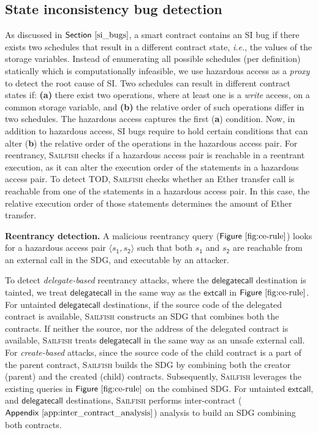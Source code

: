 \documentclass[conference, romanappendices]{tex/IEEEtran}
\theoremstyle{bfnote}
\newcommand{\toolname}{\textsc{Sailfish}\xspace}
\newcommand{\smart}{smart contract}
\newcommand{\ether}{{Ether}\xspace}
\newcommand{\reentrancy}{{reentrancy}\xspace}
\newcommand{\haz}{{hazardous access}\xspace}
\newcommand{\ie}{\textit{i.e.}}
\newcommand{\Fig}[1]{\ensuremath{\sf Figure~\ref{#1}}}
\newcommand{\Sect}[1]{\ensuremath{\sf Section~\ref{#1}}}
\newcommand{\Appen}[1]{\ensuremath{\sf Appendix~\ref{#1}}}
\begin{document}
\subsection{\textbf{State inconsistency bug detection}}
\label{sec:si_bug_detection}
As discussed in \Sect{si_bugs}, a \smart{} contains an SI bug if there exists two schedules that result in a different contract state, \ie, the values of the storage variables.
Instead of enumerating all possible schedules (per definition) statically which is computationally infeasible, we use \haz as a \textit{proxy} to detect the root cause of SI.
Two schedules can result in different contract states if:
\textbf{(a)} there exist two operations, where at least one is a \textit{write} access, on a common storage variable, and 
\textbf{(b)} the relative order of such operations differ in two schedules.
The \haz captures the first (\textbf{a}) condition.
Now, in addition to hazardous access, SI bugs require to hold certain conditions that can alter (\textbf{b}) the relative order of the operations in the \haz pair.
For \reentrancy, \toolname checks if a hazardous access pair is reachable in a reentrant execution, as it can alter the execution order of the statements in a hazardous access pair.
To detect TOD, \toolname checks whether an \ether transfer call is reachable from one of the statements in a hazardous access pair.
In this case, the relative execution order of those statements determines the amount of \ether transfer.

\noindent
\textbf{Reentrancy detection.}
A malicious \reentrancy query (\Fig{fig:ce-rule}) 
looks for a hazardous access pair $\langle s_{\mathsf{1}}, s_{\mathsf{2}} \rangle$ such that both $s_{\mathsf{1}}$ and $s_{\mathsf{2}}$ are reachable from an external call in the SDG, and executable by an attacker.

To detect \textit{delegate-based} \reentrancy attacks, where the $\mathsf{delegatecall}$ destination is tainted, we treat $\mathsf{delegatecall}$ in the same way as the  $\mathsf{extcall}$ in \Fig{fig:ce-rule}.
For untainted $\mathsf{delegatecall}$ destinations, if the source code of the delegated contract is available, \toolname constructs an SDG that combines both the contracts.
If neither the source, nor the address of the delegated contract is available, \toolname treats $\mathsf{delegatecall}$ in the same way as an unsafe external call.
For \textit{create-based} attacks, since the source code of the child contract is a part of the parent contract, \toolname builds the SDG by combining both the creator (parent) and the created (child) contracts.
Subsequently, \toolname leverages the existing queries in \Fig{fig:ce-rule} on the combined SDG.
For untainted $\mathsf{extcall}$, and $\mathsf{delegatecall}$ destinations, \toolname performs inter-contract (\Appen{app:inter_contract_analysis}) analysis to build an SDG combining both contracts.
\end{document}
